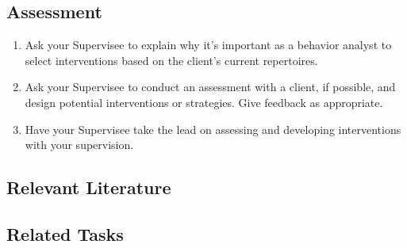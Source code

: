 \subsection{Assessment}
\begin{enumerate}
\item Ask your Supervisee to explain why it's important as a behavior analyst to select interventions based on the client's current repertoires. 
\item Ask your Supervisee to conduct an assessment with a client, if possible, and design potential interventions or strategies. Give feedback as appropriate.
\item Have your Supervisee take the lead on assessing and developing interventions with your supervision. 
%
\end{enumerate}
%
\subsection{Relevant Literature}
\begin{refsection}
\nocite{fisher2014handbook,
        noell2011building,
        shapiro2011academic}
\printbibliography[heading=none]
\end{refsection}
%
\subsection{Related Tasks}
\fourdNine{}\\
\fourgThree{}\\
\fouriThree{}\\
\fourjThree{}\\
\fouriFour{}\\
\fourjTwo{}\\
\fourjSix{}\\
\fourjSeven{}\\
\fourjEight{}\\
